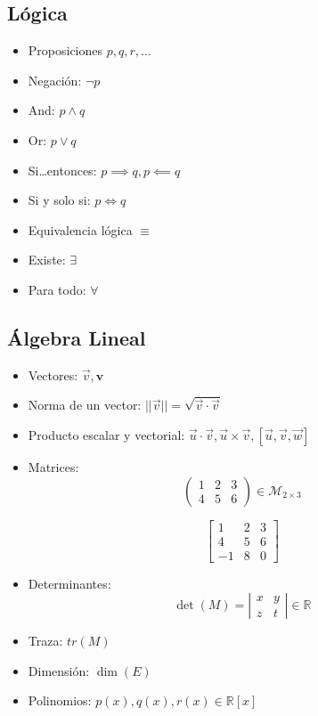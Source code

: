 \documentclass{article}
\begin{document}
\subsection{Lógica}
\begin{itemize}
    \item Proposiciones $p,q,r,\ldots$
    \item Negación: $\neg p$
    \item And: $p \land q$
    \item Or: $p \lor q$
    \item Si\ldots entonces: $p\implies q, p\impliedby q$
    \item Si y solo si: $p\iff q$
    \item Equivalencia lógica $\equiv$
    \item Existe: $\exists$
    \item Para todo: $\forall$
\end{itemize}


\subsection{Álgebra Lineal}
\begin{itemize}
    \item Vectores: $\vec{v}, \mathbf{v}$
    \item Norma de un vector: $||\vec{v}|| = \sqrt{\vec{v}\cdot \vec{v}}$
    \item Producto escalar y vectorial: $\vec{u}\cdot \vec{v}, \vec{u}\times \vec{v}, [\vec{u}, \vec{v}, \vec{w}]$
    \item Matrices: $$\left(\begin{array}{ccc}
        1 & 2 & 3  \\
        4 & 5 & 6
    \end{array}\right) \in \mathcal{M}_{2\times 3}$$
    
    $$\left[\begin{array}{rcc}
        1 & 2 & 3  \\
        4 & 5 & 6  \\
        -1 & 8 & 0
    \end{array}\right]$$
    \item Determinantes:
    $$\det(M) = \left|\begin{array}{cc}
        x & y \\
        z & t
    \end{array}\right| \in \mathbb R$$
    \item Traza: $tr(M)$
    \item Dimensión: $\dim(E)$
    \item Polinomios: $p(x), q(x), r(x) \in \mathbb R[x]$
\end{itemize}
\end{document}

